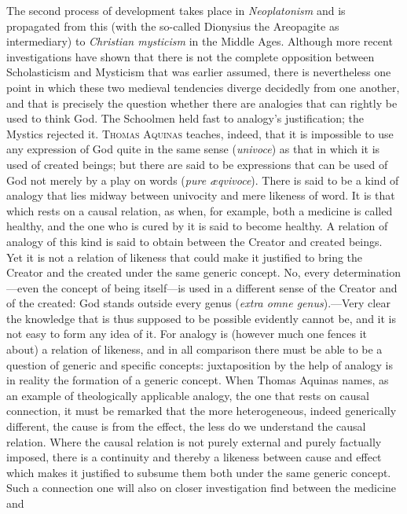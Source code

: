 \documentclass[12pt,a4paper]{book}
\newcommand{\opage}[1]{\marginnote{\footnotesize\textit{[#1]}}}
\begin{document}
The second process of development takes place in \emph{Neoplatonism} and is
propagated from this (with the so-called Dionysius the Areopagite as
intermediary) to \emph{Christian mysticism} in the Middle Ages. Although more
recent investigations have shown that there is not the complete opposition
between Scholasticism and Mysticism that was earlier assumed, there is
nevertheless one point in which these two medieval tendencies diverge
decidedly from one another, and that is precisely the question whether there
are analogies that can rightly be used to think God. The Schoolmen held fast
to analogy's justification; the Mystics rejected it. \textsc{Thomas Aquinas}
teaches, indeed, that it is impossible to use any expression of God quite in
the same sense (\textit{univoce}) as that in which it is used of created
beings; but there are said to be expressions that can be used of God not
merely by a play on words (\textit{pure æqvivoce}). There is said to be a kind
of analogy that lies midway between univocity and mere likeness of word. It is
that which rests on a causal relation, as when, for example, both a medicine
is called healthy, and the one who is cured by it is said to become healthy. A
relation of analogy of this kind is said to obtain between the Creator and
created beings. Yet it is not a relation of likeness that could make it
justified to bring the Creator and the created under the same generic concept.
No, every determination---even the concept of being itself---is used in a
different sense of the Creator and of the created: God stands outside every
genus (\textit{extra omne genus}).---Very clear the knowledge that is thus
supposed to be possible evidently cannot be, and it is not easy to form any
idea of it. For analogy is (however much one fences it about) a relation of
likeness, and in all comparison there must be able to be a question of generic
and specific concepts: juxtaposition by the help of analogy is in reality the
formation of a generic concept. When Thomas Aquinas names, as an example of
theologically applicable analogy, the one that rests on causal connection, it
must be remarked that the more heterogeneous, indeed generically different,
the cause is from the effect, the less do we understand the causal relation.
Where the causal relation is not purely external and purely factually imposed,
there is a continuity 
\opage{43}and thereby a likeness between cause and effect which
makes it justified to subsume them both under the same generic concept. Such a
connection one will also on closer investigation find between the medicine and
\end{document}
